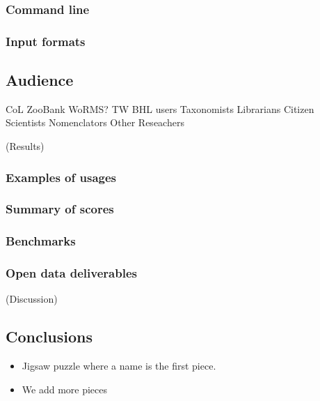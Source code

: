 \documentclass[
]{article}
\providecommand{\tightlist}{%
  \setlength{\itemsep}{0pt}\setlength{\parskip}{0pt}}
\begin{document}
\hypertarget{command-line}{%
\subsubsection{Command line}\label{command-line}}

\hypertarget{input-formats}{%
\subsubsection{Input formats}\label{input-formats}}

\hypertarget{audience}{%
\subsection{Audience}\label{audience}}

CoL ZooBank WoRMS? TW BHL users Taxonomists Librarians Citizen
Scientists Nomenclators Other Reseachers

(Results)

\hypertarget{examples-of-usages}{%
\subsubsection{Examples of usages}\label{examples-of-usages}}

\hypertarget{summary-of-scores}{%
\subsubsection{Summary of scores}\label{summary-of-scores}}

\hypertarget{benchmarks}{%
\subsubsection{Benchmarks}\label{benchmarks}}

\hypertarget{open-data-deliverables}{%
\subsubsection{Open data deliverables}\label{open-data-deliverables}}

(Discussion)

\hypertarget{conclusions}{%
\subsection{Conclusions}\label{conclusions}}

\begin{itemize}
\tightlist
\item
  Jigsaw puzzle where a name is the first piece.
\item
  We add more pieces
\end{itemize}
\end{document}
